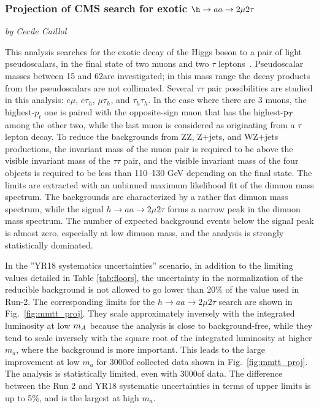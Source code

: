 \subsubsection{Projection of CMS search for exotic $\h\to aa \to 2\mu 2\tau$}
\begin{center}
 {\it{ by Cecile Caillol}}
\end{center}


This analysis searches for the exotic decay of the Higgs boson to a pair of light pseudoscalars, in the
final state of two muons and two $\tau$ leptons~\cite{Sirunyan:2018mbx}. Pseudoscalar
masses between 15 and 62\GeV are investigated; in this mass range the decay products from the pseudoscalars are
not collimated.
Several $\tau\tau$ pair possibilities are studied in this analysis: $e\mu$, $e\tau_h$,
$\mu\tau_h$, and $\tau_h\tau_h$. In the case where there are 3 muons, the highest-$p_t$ one is paired with
the opposite-sign muon that has the highest-$\mathrm{p}_{T}$ among the other two, while the last muon is considered as
originating from a $\tau$ lepton decay.
To reduce the backgrounds from ZZ, Z+jets, and WZ+jets productions, the invariant mass of the muon pair
is required to be above the visible invariant mass of the $\tau\tau$ pair, and the
visible invariant mass of the four objects is required to be less than 110--130 GeV depending on the final state.
The limits are extracted with an unbinned maximum likelihood fit of the dimuon mass spectrum.
The backgrounds are characterized by a rather flat dimuon mass spectrum, while the signal $h\to aa \to 2\mu2\tau$
forms a narrow peak in the dimuon mass spectrum.
The number of expected background events below the signal peak is almost zero,
especially at low dimuon mass, and the analysis is strongly statistically dominated.

In the ''YR18 systematics uncertainties'' scenario, in addition to the limiting values detailed in Table \ref{tab:floors}, the uncertainty in the normalization of the reducible background is not allowed to go lower than 20\% of the value used in Run-2. The corresponding limits for the $h \to aa \to 2\mu2\tau$ search are shown in Fig.~\ref{fig:mmtt_proj}.
They scale approximately inversely with the integrated luminosity at low $m_{A}$ because the
analysis is close to background-free, while they tend to scale inversely with the square root of the integrated luminosity at higher $m_a$, where the background is more important. This leads to the large improvement at low $m_a$ for 3000\fbinv of collected data shown in Fig.~\ref{fig:mmtt_proj}. The analysis is statistically limited, even with 3000\fbinv of data. The difference between the Run 2 and YR18 systematic uncertainties in terms of upper limits
is up to 5\%, and is the largest at high $m_a$.

